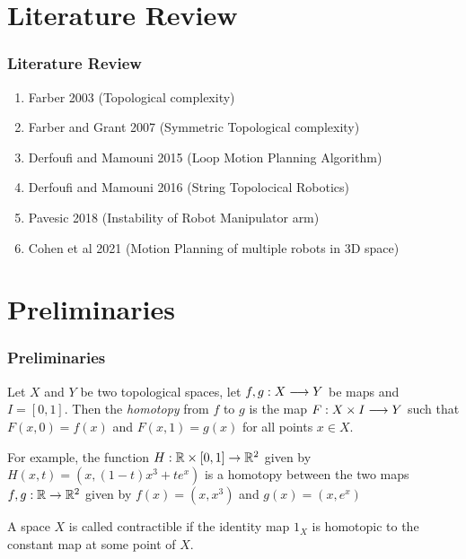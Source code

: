 \documentclass{beamer}
\begin{document}
\section{Literature Review}
\begin{frame}
    \frametitle{Literature Review}
    \begin{enumerate}
        \item Farber 2003 (Topological complexity)
        \item Farber and Grant 2007 (Symmetric Topological complexity)
        \item Derfoufi and Mamouni 2015 (Loop Motion Planning Algorithm)
        \item Derfoufi and Mamouni 2016 (String Topolocical Robotics)
        \item Pavesic 2018 (Instability of Robot Manipulator arm)
        \item Cohen et al 2021 (Motion Planning of multiple robots in 3D space)
    \end{enumerate}
\end{frame}

\section{Preliminaries}
\begin{frame}
    \frametitle{Preliminaries}
    \begin{defn}[Homotopy]
        Let $X$ and $Y$ be two topological spaces, let $f,g : X \longrightarrow Y$ be maps and $I = [0,1]$.
        Then the \textit{homotopy} from $f$ to $g$ is the map $F: X \times I \longrightarrow Y$ such that $F(x,0) = f(x)$ and $F(x,1) = g(x)$ for all points $x \in X$.
    \end{defn}
    For example, the function $H : \mathbb{R} \times [0,1] \rightarrow \mathbb{R}^2$ given by $H (x,t) = \left(x, (1-t)x^3 + te^x\right)$ is a homotopy between the two maps $f,g : \mathbb{R} \rightarrow \mathbb{R}^2$ given by $f(x) = (x, x^3)$ and $g(x) = (x, e^x)$

    \begin{defn}
        A space $X$ is called contractible if the identity map $1_X$ is homotopic to the constant map at some point of $X$.
    \end{defn}
\end{frame}
\end{document}
